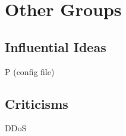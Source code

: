 \section{Other Groups}
\label{sec:groups}

\subsection{Influential Ideas}
P (config file)

\subsection{Criticisms}
DDoS
